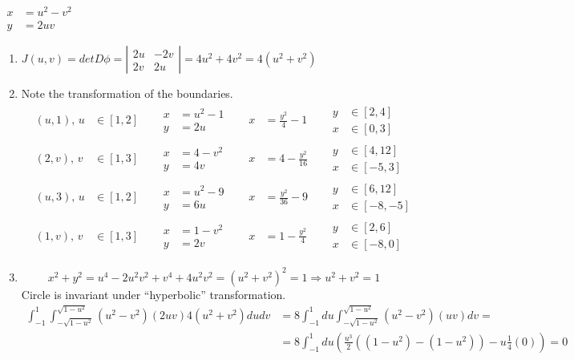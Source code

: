 \documentclass[twoside]{amsart}
\theoremstyle{plain}
\theoremstyle{definition}
\newcommand{\exercisehead}[1]
  {
   \noindent{\small\bf Exercise #1.}
   \smallskip}
\begin{document}
\exercisehead{18} $\begin{aligned} x & = u^2 - v^2 \\ y & = 2uv \end{aligned}$ 
\begin{enumerate}
\item $J(u,v) = det{D\phi} = \left| \begin{matrix} 2u & -2v \\ 2v & 2u \end{matrix} \right| = 4 u^2 + 4 v^2 = 4(u^2 + v^2)$
\item Note the transformation of the boundaries.  \[
\begin{aligned}
  & (u,1), \, u & \in [1,2] \quad & \begin{aligned} x & = u^2 - 1 \\ y & = 2u \end{aligned} \quad & x & = \frac{y^2 }{4} - 1 \quad & \begin{aligned} y & \in [2,4] \\ x & \in [0,3] \end{aligned} \\ 
  & (2,v), \, v & \in [1,3] \quad & \begin{aligned} x & = 4 - v^2 \\ y & = 4 v \end{aligned} \quad & x & = 4 - \frac{y^2}{16} \quad & \begin{aligned} y & \in [4,12] \\ x & \in [-5,3] \end{aligned} \\
  & (u,3), \, u & \in [1,2] \quad & \begin{aligned} x & = u^2 - 9 \\ y & = 6u \end{aligned} \quad & x & = \frac{y^2}{36} - 9 \quad & \begin{aligned} y & \in [6,12] \\ x & \in [-8,-5] \end{aligned} \\ 
  & (1,v), \, v & \in [1,3] \quad & \begin{aligned} x & = 1 - v^2 \\ y & = 2v \end{aligned} \quad & x & = 1 - \frac{y^2}{4} \quad & \begin{aligned} y & \in [2,6] \\ x & \in [-8,0] \end{aligned}
\end{aligned}
\]
\item \[
x^2 + y^2 = u^4 - 2u^2 v^2 + v^4 + 4u^2 v^2 = (u^2 + v^2)^2 = 1 \Longrightarrow u^2 + v^2 = 1 
\]
Circle is invariant under ``hyperbolic'' transformation.  
\[
\begin{aligned}
  \int_{-1}^1 \int_{-\sqrt{ 1 - u^2}}^{\sqrt{ 1 - u^2}} (u^2 - v^2)(2uv) 4 (u^2 + v^2) du dv & = 8 \int_{-1}^1 du \int_{-\sqrt{ 1 - u^2}}^{\sqrt{ 1 - u^2 }} (u^2 - v^2)(uv) dv = \\
  & = 8 \int_{-1}^1 du \left( \frac{u^3}{2} ((1-u^2) - (1-u^2) ) - u \frac{1}{4} (0) \right) = \boxed{ 0 } 
\end{aligned}
\]
\end{enumerate}
\end{document}
